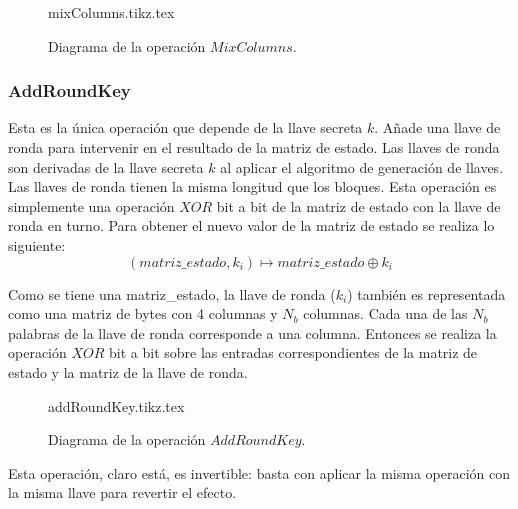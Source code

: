 \begin{figure}
  \begin{center}
    {mixColumns.tikz.tex}
    \caption{Diagrama de la operación $MixColumns$.}
   \end{center}
\end{figure}


\subsubsection{AddRoundKey}

Esta es la única operación que depende de la llave secreta $k$. Añade una
llave de ronda para intervenir en el resultado de la matriz de estado.
Las llaves de ronda son derivadas de la llave secreta $k$ al aplicar el
algoritmo de generación de llaves. Las llaves de ronda tienen la misma
longitud que los bloques. Esta operación es simplemente una operación
$XOR$ bit a bit de la matriz de estado con la llave de ronda en turno.
Para obtener el nuevo valor de la matriz de estado se realiza lo
siguiente:
\begin{equation}
  \label{cifrado_aes_addkey}
  (matriz\_estado, k_i) \mapsto matriz\_estado \oplus k_i
\end{equation}

Como se tiene una matriz\_estado, la llave de ronda ($k_i$) también
es representada como una matriz de bytes con 4 columnas y $N_b$ columnas.
Cada una de las $N_b$ palabras de la llave de ronda corresponde a una
columna. Entonces se realiza la operación $XOR$ bit a bit sobre las
entradas correspondientes de la matriz de estado y la matriz de la llave
de ronda.

\begin{figure}
  \begin{center}
    {addRoundKey.tikz.tex}
    \caption{Diagrama de la operación $AddRoundKey$.}
    \label{diagrama:aes_add_round_key}
   \end{center}
\end{figure}

Esta operación, claro está, es invertible: basta con aplicar la misma
operación con la misma llave para revertir el efecto.
